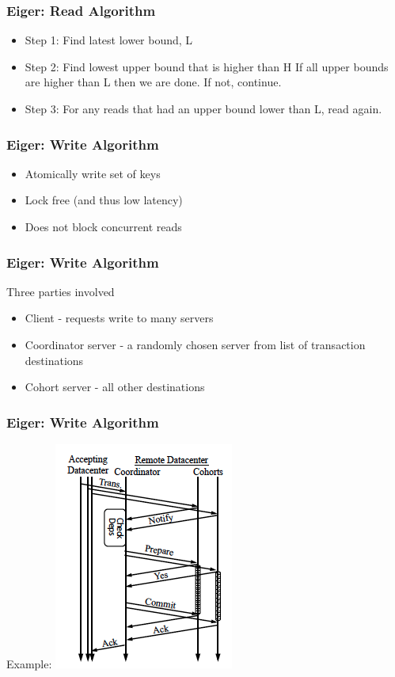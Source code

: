 \documentclass{beamer}
\begin{document}
\begin{frame}
\frametitle{Eiger: Read Algorithm}
\begin{itemize}
\item Step 1: Find latest lower bound, L
\item Step 2: Find lowest upper bound that is higher than H
\newline If all upper bounds are higher than L then we are done.  If not, continue. 
\item Step 3: For any reads that had an upper bound lower than L, read again.
\end{itemize}  
\end{frame}


\begin{frame}
\frametitle{Eiger: Write Algorithm}
\begin{itemize}
\item Atomically write set of keys
\item Lock free (and thus low latency)
\item Does not block concurrent reads
\end{itemize}  
\end{frame}



\begin{frame}
\frametitle{Eiger: Write Algorithm}
Three parties involved
\begin{itemize}
	\item Client - requests write to many servers
	\item Coordinator server - a randomly chosen server from list of transaction destinations
	\item Cohort server - all other destinations
\end{itemize}  
\end{frame}

\begin{frame}
\frametitle{Eiger: Write Algorithm}
Example:
\includegraphics[scale=0.5]{Figure_Write_Transaction.png}
\end{frame}
\end{document}

